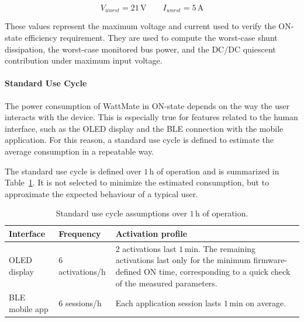 \begin{equation}
	\label{eq:on_state_worst_case_conditions}
	V_{worst} = 21\,\mathrm{V}
	\qquad
	I_{worst} = 5\,\mathrm{A}
\end{equation}

These values represent the maximum voltage and current used to verify the ON-state efficiency requirement. 
They are used to compute the worst-case shunt dissipation, the worst-case monitored bus power, and the DC/DC quiescent contribution under maximum input voltage.

 

\paragraph{Standard Use Cycle}
\label{sec:standard_use_cycle}

The power consumption of WattMate in ON-state depends on the way the user interacts with the device. 
This is especially true for features related to the human interface, such as the OLED display and the BLE connection with the mobile application. 
For this reason, a standard use cycle is defined to estimate the average consumption in a repeatable way.

The standard use cycle is defined over \(1\,\mathrm{h}\) of operation and is summarized in Table~\ref{tab:standard_use_cycle}. 
It is not selected to minimize the estimated consumption, but to approximate the expected behaviour of a typical user.

\begin{table}[H]
	\centering
	\small
	\caption{Standard use cycle assumptions over \(1\,\mathrm{h}\) of operation.}
	\label{tab:standard_use_cycle}
	\begin{tabular}{p{} p{} p{}}
		\toprule
		\textbf{Interface} & \textbf{Frequency} & \textbf{Activation profile} \\
		\midrule
		OLED display &
		\(6\) activations/h &
		\(2\) activations last \(1\,\mathrm{min}\). 
		The remaining activations last only for the minimum firmware-defined ON time, corresponding to a quick check of the measured parameters. \\
		
		BLE mobile app &
		\(6\) sessions/h &
		Each application session lasts \(1\,\mathrm{min}\) on average. \\
		\bottomrule
	\end{tabular}
\end{table}

